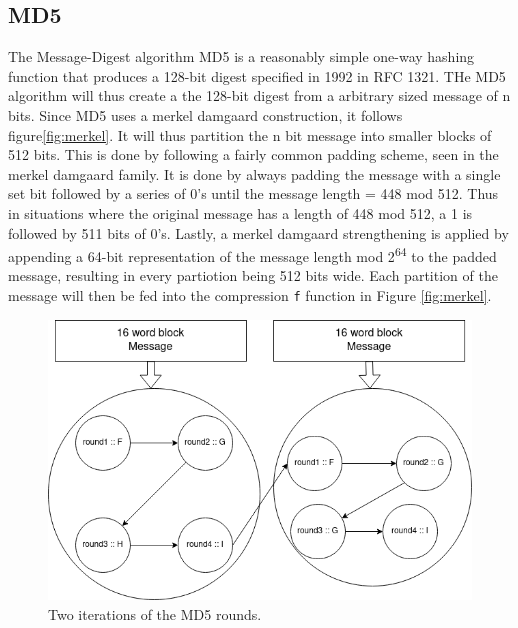\documentclass[a4paper]{article}
\begin{document}
\subsection{MD5}
\label{MD5alg}
The Message-Digest algorithm MD5 is a reasonably simple one-way hashing function that produces a 128-bit digest specified in 1992 in RFC 1321\cite{rfc1321}.
THe MD5 algorithm will  thus create a the 128-bit digest from a arbitrary sized message of n bits. Since MD5 uses a merkel damgaard construction, it follows figure\ref{fig:merkel}. It will thus partition the n bit message into smaller blocks of 512 bits. This is done by following a fairly common padding scheme, seen in the merkel damgaard family. It is done by always padding the message with a single set bit followed by a series of 0's until the message length = 448 mod 512. Thus in situations where the original message has a length of 448 mod 512, a 1 is followed by 511 bits of 0's. Lastly, a merkel damgaard strengthening is applied by appending a 64-bit representation of the message length mod 2\textsuperscript{64} to the padded message, resulting in every partiotion being 512 bits wide.
Each partition of the message will then be fed into the compression \texttt{f} function in Figure \ref{fig:merkel}.

\begin{figure}[htbp]
\centering
\includegraphics[width=.9\linewidth]{./Background/MD5rounds.png}
\caption{\label{fig:MD5}Two iterations of the MD5 rounds.}
\end{figure}
\end{document}
